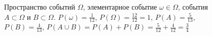\begin{figure}
\centering



\caption{Пространство событий $\Omega$, элементарное событие 
  $\omega \in \Omega$, события $A \subset \Omega$ и
$B \subset \Omega$. 
$P\left(\omega\right) = \frac{1}{12}$, 
$P\left(\Omega\right) = \frac{12}{12} = 1$,
$P\left(A\right) = \frac{5}{13}$,
$P\left(B\right) = \frac{4}{13}$,
$P\left(A\cup B\right) = 
P\left(A\right) + P\left(B\right) = 
\frac{5}{12} + \frac{4}{12} = \frac{3}{4}$
}
\label{figAddProbabilityAxioms}
\end{figure}
